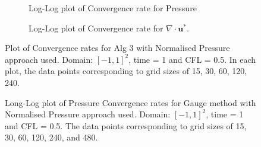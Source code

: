 \begin{figure}[H]
	\centering
	\begin{subfigure}[t]{4.5in}
		\centering
		\caption{Log-Log plot of Convergence rate for Pressure}\label{fig:6.19a}		
	\end{subfigure}
	\quad
	\begin{subfigure}[t]{4.5in}
		\centering
		\caption{Log-Log plot of Convergence rate for $\nabla \cdot \textbf{u}^*$. }\label{fig:6.19b}
	\end{subfigure}
	\caption{Plot of Convergence rates for Alg 3 with Normalised Pressure approach used. Domain: $[-1,1]^2$, time = 1 and CFL = 0.5. In each plot, the data points corresponding to grid sizes of 15, 30, 60, 120, 240.}\label{fig:6.16}
\end{figure}

\begin{figure}[H]
	\centering
	\caption{Long-Log plot of Pressure Convergence rates for Gauge method with Normalised Pressure approach used. Domain: $[-1,1]^2$, time = 1 and CFL = 0.5. The data points corresponding to grid sizes of 15, 30, 60, 120, 240, and 480.}\label{fig:6.16}
\end{figure}

